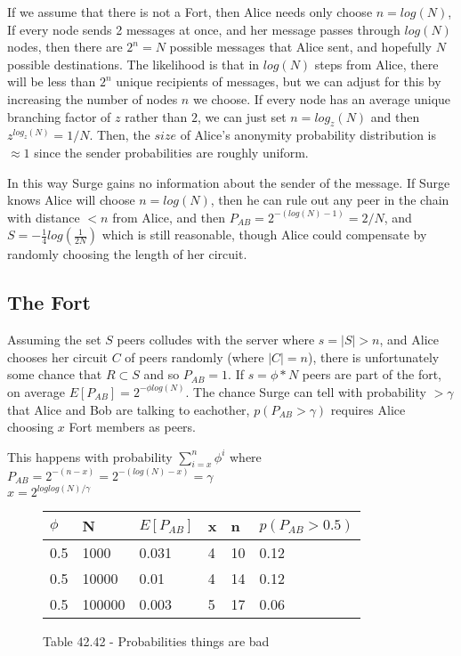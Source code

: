 \documentclass[twocolumn]{paper}
\begin{document}
If we assume that there is not a Fort, then Alice needs only choose $n = log(N)$, If every node sends 2 messages at once, and her message passes through $log(N)$ nodes, then there are $2^n = N$ possible messages that Alice sent, and hopefully $N$ possible destinations. The likelihood is that in $log(N)$ steps from Alice, there will be less than $2^n$ unique recipients of messages, but we can adjust for this by increasing the number of nodes $n$ we choose. If every node has an average unique branching factor of $z$ rather than $2$, we can just set $n = log_z(N)$ and then $z^{log_z(N)} = 1/N$. Then, the $size$ of Alice's anonymity probability distribution is $\approx 1$ since the sender probabilities are roughly uniform.

In this way Surge gains no information about the sender of the message. If Surge knows Alice will choose $n = log(N)$, then he can rule out any peer in the chain with distance $< n$ from Alice, and then $P_{AB} = 2^{-(log(N)-1)} = 2/N$, and $S = - \frac{1}{4} log(\frac{1}{2N})$ which is still reasonable, though Alice could compensate by randomly choosing the length of her circuit. 

\subsection{The Fort} Assuming the set $S$ peers colludes with the server where $s = |S| > n$, and Alice chooses her circuit $C$ of peers randomly (where $|C| = n$), there is unfortunately some chance that $R \subset S$ and so $P_{AB} = 1$. If $s = \phi*N$ peers are part of the fort, on average $E[P_{AB}] = 2^{-\phi log(N)}$. The chance Surge can tell with probability $> \gamma$ that Alice and Bob are talking to eachother, $p(P_{AB} > \gamma)$ requires Alice choosing $x$ Fort members as peers. 

This happens with probability $\sum\limits_{i=x}^n\phi^i$ where 
\\ $P_{AB} = 2^{-(n - x)} = 2^{-(log(N) - x)} = \gamma$
\\ $x = 2^{loglog(N)/\gamma}$

\begin{figure}[ht]
  \begin{tabular}{| l | l | l | l | l | l |}
    \hline
    $\phi$ & N & $E[P_{AB}]$ & x & n & $p(P_{AB} > 0.5)$ \\\hline
    0.5 & 1000 & 0.031 & 4 & 10 & 0.12\\
    0.5 & 10000 & 0.01 & 4 & 14 & 0.12\\
    0.5 & 100000 & 0.003 & 5 & 17 & 0.06\\
    \hline
  \end{tabular}
  \caption{Table 42.42 - Probabilities things are bad}
\end{figure}
\end{document}
